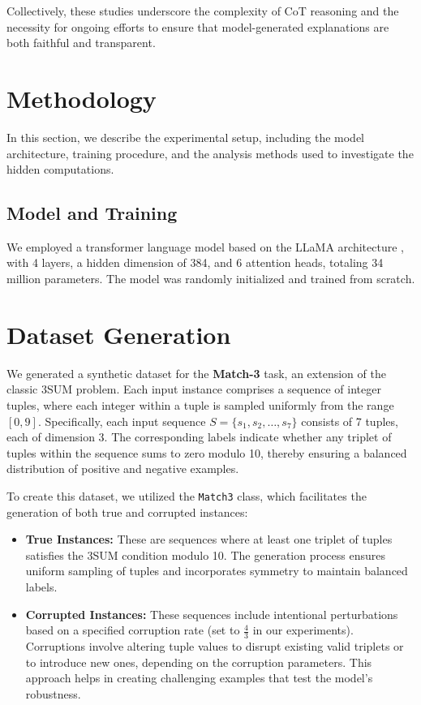 \documentclass{article}
\begin{document}
Collectively, these studies underscore the complexity of CoT reasoning and the necessity for ongoing efforts to ensure that model-generated explanations are both faithful and transparent.

\section{Methodology}

In this section, we describe the experimental setup, including the model architecture, training procedure, and the analysis methods used to investigate the hidden computations.

\subsection{Model and Training}

We employed a transformer language model based on the LLaMA architecture \cite{touvron2023llama}, with 4 layers, a hidden dimension of 384, and 6 attention heads, totaling 34 million parameters. The model was randomly initialized and trained from scratch.

\section{Dataset Generation}

We generated a synthetic dataset for the \textbf{Match-3} task, an extension of the classic 3SUM problem. Each input instance comprises a sequence of integer tuples, where each integer within a tuple is sampled uniformly from the range $[0, 9]$. Specifically, each input sequence \( S = \{s_1, s_2, \dots, s_7\} \) consists of 7 tuples, each of dimension 3. The corresponding labels indicate whether any triplet of tuples within the sequence sums to zero modulo 10, thereby ensuring a balanced distribution of positive and negative examples.

To create this dataset, we utilized the \texttt{Match3} class, which facilitates the generation of both true and corrupted instances:

\begin{itemize}
    \item \textbf{True Instances:} These are sequences where at least one triplet of tuples satisfies the 3SUM condition modulo 10. The generation process ensures uniform sampling of tuples and incorporates symmetry to maintain balanced labels.
    
    \item \textbf{Corrupted Instances:} These sequences include intentional perturbations based on a specified corruption rate (set to \( \frac{4}{3} \) in our experiments). Corruptions involve altering tuple values to disrupt existing valid triplets or to introduce new ones, depending on the corruption parameters. This approach helps in creating challenging examples that test the model's robustness.
\end{itemize}
\end{document}
